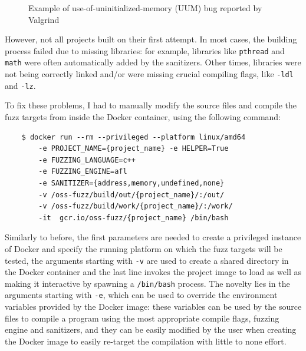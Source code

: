\begin{figure}[h]
\caption{Example of use-of-uninitialized-memory (UUM) bug reported by Valgrind}
\label{fig:valgrind_example}
\end{figure}



\newpage
However, not all projects built on their first attempt.
In most cases, the building process failed due to missing libraries: for example, libraries like \verb|pthread| and \verb|math| were often automatically added by the sanitizers. Other times, libraries were not being correctly linked and/or were missing crucial compiling flags, like \verb|-ldl| and \verb|-lz|.

To fix these problems, I had to manually modify the source files and compile the fuzz targets from inside the Docker container, using the following command:
\begin{verbatim}
    $ docker run --rm --privileged --platform linux/amd64 
        -e PROJECT_NAME={project_name} -e HELPER=True 
        -e FUZZING_LANGUAGE=c++ 
        -e FUZZING_ENGINE=afl 
        -e SANITIZER={address,memory,undefined,none} 
        -v /oss-fuzz/build/out/{project_name}/:/out/   
        -v /oss-fuzz/build/work/{project_name}/:/work/
        -it  gcr.io/oss-fuzz/{project_name} /bin/bash
\end{verbatim}

Similarly to before, the first parameters are needed to create a privileged instance of Docker and specify the running platform on which the fuzz targets will be tested, the arguments starting with \verb|-v| are used to create a shared directory in the Docker container and the last line invokes the project image to load as well as making it interactive by spawning a \verb|/bin/bash| process.
The novelty lies in the arguments starting with \verb|-e|, which can be used to override the environment variables provided by the Docker image: these variables can be used by the source files to compile a program using the most appropriate compile flags, fuzzing engine and sanitizers, and they can be easily modified by the user when creating the Docker image to easily re-target the compilation with little to none effort.

